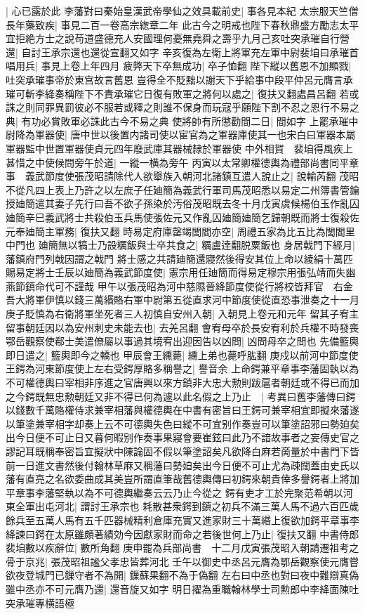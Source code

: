 |{
	心已露於此}
李藩對曰秦始皇漢武帝學仙之效具載前史|{
	事各見本紀}
太宗服天竺僧長年藥致疾|{
	事見二百一卷高宗緫章二年}
此古今之明戒也陛下春秋鼎盛方勵志太平宜拒絶方士之說苟道盛德充人安國理何憂無堯舜之壽乎九月己亥吐突承璀自行營還|{
	自討王承宗還也還從宣翻又如字}
辛亥復為左衛上將軍充左軍中尉裴垍曰承璀首唱用兵|{
	事見上卷上年四月}
疲弊天下卒無成功|{
	卒子恤翻}
陛下縱以舊恩不加顯戮|{
	吐突承璀事帝於東宫故言舊恩}
豈得全不貶黜以謝天下乎給事中段平仲呂元膺言承璀可斬李絳奏稱陛下不責承璀它日復有敗軍之將何以處之|{
	復扶又翻處昌呂翻}
若或誅之則同罪異罰彼必不服若或釋之則誰不保身而玩寇乎願陛下割不忍之恩行不易之典|{
	有功必賞敗軍必誅此古今不易之典}
使將帥有所懲勸間二日|{
	間如字}
上罷承璀中尉降為軍器使|{
	唐中世以後置内諸司使以宦官為之軍器庫使其一也宋白曰軍器本屬軍器監中世置軍器使貞元四年廢武庫其器械隸於軍器使}
中外相賀　裴垍得風疾上甚惜之中使候問旁午於道|{
	一縱一横為旁午}
丙寅以太常卿權德輿為禮部尚書同平章事　義武節度使張茂昭請除代人欲舉族入朝河北諸鎮互遣人說止之|{
	說輸芮翻}
茂昭不從凡四上表上乃許之以左庶子任廸簡為義武行軍司馬茂昭悉以易定二州簿書管鑰授廸簡遣其妻子先行曰吾不欲子孫染於汚俗茂昭既去冬十月戊寅虞候楊伯玉作亂囚廸簡辛巳義武將士共殺伯玉兵馬使張佐元又作亂囚廸簡廸簡乞歸朝既而將士復殺佐元奉廸簡主軍務|{
	復扶又翻}
時易定府庫罄竭閭閻亦空|{
	周禮五家為比五比為閭閻里中門也}
廸簡無以犒士乃設糲飯與士卒共食之|{
	糲盧逹翻脱粟飯也}
身居戟門下經月|{
	藩鎮府門列戟因謂之戟門}
將士感之共請廸簡還寢然後得安其位上命以綾絹十萬匹賜易定將士壬辰以廸簡為義武節度使|{
	憲宗用任廸簡而得易定穆宗用張弘靖而失幽燕節鎮命代可不謹哉}
甲午以張茂昭為河中慈隰晉絳節度使從行將校皆拜官　右金吾大將軍伊慎以錢三萬緡賂右軍中尉第五從直求河中節度使從直恐事泄奏之十一月庚子貶慎為右衛將軍坐死者三人初慎自安州入朝|{
	入朝見上卷元和元年}
留其子宥主留事朝廷因以為安州刺史未能去也|{
	去羌呂翻}
會宥母卒於長安宥利於兵權不時發喪鄂岳觀察使郗士美遣僚屬以事過其境宥出迎因告以凶問|{
	凶問母卒之問也}
先備籃輿即日遣之|{
	籃輿即今之轎也}
甲辰會王纁薨|{
	纁上弟也薨呼肱翻}
庚戍以前河中節度使王鍔為河東節度使上左右受鍔厚賂多稱譽之|{
	譽音余}
上命鍔兼平章事李藩固執以為不可權德輿曰宰相非序進之官唐興以來方鎮非大忠大勲則跋扈者朝廷或不得已而加之今鍔既無忠勲朝廷又非不得已何為遽以此名假之上乃止　|{
	考異曰舊李藩傳曰鍔以錢數千萬賂權侍求兼宰相藩與權德輿在中書有密旨曰王鍔可兼宰相宜即擬來藩遂以筆塗兼宰相字却奏上云不可德輿失色曰縱不可宜别作奏豈可以筆塗詔邪曰勢廹矣出今日便不可止日又暮何暇别作奏事果寢會要崔鉉曰此乃不諳故事者之妄傳史官之謬記耳既稱奉密旨宜擬狀中陳論固不假以筆塗詔矣凡欲降白麻若啇量於中書門下皆前一日進文書然後付翰林草麻又稱藩曰勢廹矣出今日便不可止尤為疎闊蓋由史氏以藩有直亮之名欲委曲成其美豈所謂直筆哉舊德輿傳曰初鍔來朝貴倖多譽鍔者上將加平章事李藩堅執以為不可德輿繼奏云云乃止今從之}
鍔有吏才工於完聚范希朝以河東全軍出屯河北|{
	謂討王承宗也}
耗散甚衆鍔到鎮之初兵不滿三萬人馬不過六百匹歲餘兵至五萬人馬有五千匹器械精利倉庫充實又進家財三十萬緡上復欲加鍔平章事李絳諫曰鍔在太原雖頗著績効今因獻家財而命之若後世何上乃止|{
	復扶又翻}
中書侍郎裴垍數以疾辭位|{
	數所角翻}
庚申罷為兵部尚書　十二月戊寅張茂昭入朝請遷祖考之骨于京兆|{
	張茂昭祖謐父孝忠皆葬河北}
壬午以御史中丞呂元膺為鄂岳觀察使元膺嘗欲夜登城門已鏁守者不為開|{
	鏁蘇果翻不為于偽翻}
左右曰中丞也對曰夜中難辯真偽雖中丞亦不可元膺乃還|{
	還音旋又如字}
明日擢為重職翰林學士司勲郎中李絳面陳吐突承璀專横語極

